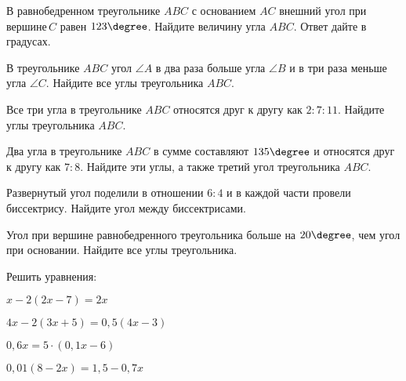 %
%
%
\begin{homework}[number=2]
		\begin{listofex}
			\item В равнобедренном треугольнике \(ABC\) с основанием \(AC\) внешний угол при вершине \(C\) равен \(123 \degree \). Найдите величину угла \(ABC\). Ответ дайте в градусах.
			\item В треугольнике \( ABC \) угол \( \angle A \) в два раза больше угла \( \angle B \) и в три раза меньше угла \( \angle C \). Найдите все углы треугольника \( ABC \).
			\item Все три угла в треугольнике \( ABC \) относятся друг к другу как \( 2:7:11 \). Найдите углы треугольника \( ABC \).
			\item Два угла в треугольнике \( ABC \) в сумме составляют \( 135\degree \) и относятся друг к другу как \( 7:8 \). Найдите эти углы, а также третий угол треугольника \( ABC \).
			\item Развернутый угол поделили в отношении \( 6:4 \) и в каждой части провели биссектрису. Найдите угол между биссектрисами.
			\item Угол при вершине равнобедренного треугольника больше на \(20 \degree\), чем угол при основании. Найдите все углы треугольника.
			\item Решить уравнения:
			\begin{enumcols}[itemcolumns=2]
				\item \( x-2(2x-7)=2x \)
				\item \( 4x-2(3x+5)=0,5(4x-3) \)
				\item \( 0,6x=5 \cdot (0,1x-6) \)
				\item \( 0,01(8-2x)=1,5-0,7x \)
		\end{enumcols}
	\end{listofex}
\end{homework}
%
%
